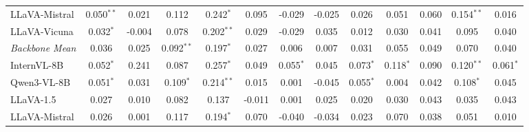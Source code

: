 \begin{table}[h]
\begin{tabular}{lcccccccccccc}
\quad LLaVA-Mistral & \cellcolor{orange!12}0.050$^{**}$ & \cellcolor{orange!12}0.021 & \cellcolor{orange!24}0.112 & \cellcolor{orange!36}0.242$^{*}$ & \cellcolor{orange!24}0.095 & \cellcolor{blue!10}-0.029 & \cellcolor{blue!10}-0.025 & \cellcolor{orange!12}0.026 & \cellcolor{orange!12}0.051 & \cellcolor{orange!12}0.060 & \cellcolor{orange!36}0.154$^{**}$ & \cellcolor{orange!12}0.016 \\
\quad LLaVA-Vicuna & \cellcolor{orange!12}0.032$^{*}$ & -0.004 & \cellcolor{orange!24}0.078 & \cellcolor{orange!36}0.202$^{**}$ & \cellcolor{orange!12}0.029 & \cellcolor{blue!10}-0.029 & \cellcolor{orange!12}0.035 & \cellcolor{orange!12}0.012 & \cellcolor{orange!12}0.030 & \cellcolor{orange!12}0.041 & \cellcolor{orange!24}0.095 & \cellcolor{orange!12}0.040 \\
\midrule
\rowcolor{gray!12}\textit{Backbone Mean} & \cellcolor{orange!12}0.036 & \cellcolor{orange!12}0.025 & \cellcolor{orange!24}0.092$^{**}$ & \cellcolor{orange!36}0.197$^{*}$ & \cellcolor{orange!12}0.027 & 0.006 & 0.007 & \cellcolor{orange!12}0.031 & \cellcolor{orange!12}0.055 & \cellcolor{orange!12}0.049 & \cellcolor{orange!24}0.070 & \cellcolor{orange!12}0.040 \\
\quad InternVL-8B & \cellcolor{orange!12}0.052$^{*}$ & \cellcolor{orange!36}0.241 & \cellcolor{orange!24}0.087 & \cellcolor{orange!36}0.257$^{*}$ & \cellcolor{orange!12}0.049 & \cellcolor{orange!12}0.055$^{*}$ & \cellcolor{orange!12}0.045 & \cellcolor{orange!24}0.073$^{*}$ & \cellcolor{orange!24}0.118$^{*}$ & \cellcolor{orange!24}0.090 & \cellcolor{orange!24}0.120$^{**}$ & \cellcolor{orange!24}0.061$^{*}$ \\
\quad Qwen3-VL-8B & \cellcolor{orange!12}0.051$^{*}$ & \cellcolor{orange!12}0.031 & \cellcolor{orange!24}0.109$^{*}$ & \cellcolor{orange!36}0.214$^{**}$ & \cellcolor{orange!12}0.015 & 0.001 & \cellcolor{blue!10}-0.045 & \cellcolor{orange!12}0.055$^{*}$ & 0.004 & \cellcolor{orange!12}0.042 & \cellcolor{orange!24}0.108$^{*}$ & \cellcolor{orange!12}0.045 \\
\quad LLaVA-1.5 & \cellcolor{orange!12}0.027 & \cellcolor{orange!12}0.010 & \cellcolor{orange!24}0.082 & \cellcolor{orange!24}0.137 & \cellcolor{blue!10}-0.011 & 0.001 & \cellcolor{orange!12}0.025 & \cellcolor{orange!12}0.020 & \cellcolor{orange!12}0.030 & \cellcolor{orange!12}0.043 & \cellcolor{orange!12}0.035 & \cellcolor{orange!12}0.043 \\
\quad LLaVA-Mistral & \cellcolor{orange!12}0.026 & 0.001 & \cellcolor{orange!24}0.117 & \cellcolor{orange!36}0.194$^{*}$ & \cellcolor{orange!24}0.070 & \cellcolor{blue!10}-0.040 & \cellcolor{blue!10}-0.034 & \cellcolor{orange!12}0.023 & \cellcolor{orange!24}0.070 & \cellcolor{orange!12}0.038 & \cellcolor{orange!12}0.051 & \cellcolor{orange!12}0.010 \\

\end{tabular}
\end{table}
